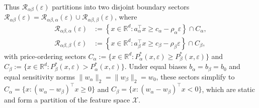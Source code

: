 Thus $\mathcal{R}_{\alpha\beta}(\varepsilon)$ partitions into two disjoint boundary sectors $\mathcal{R}_{\alpha\beta}(\varepsilon) = \mathcal{R}_{\alpha\beta,\alpha}(\varepsilon) \cup \mathcal{R}_{\alpha\beta,\beta}(\varepsilon)$, where
\begin{align}
\mathcal{R}_{\alpha\beta,\alpha}(\varepsilon) &:= \left\{x \in \mathbb{R}^d : a_\alpha^\top x \ge c_\alpha - \rho_\alpha \varepsilon\right\} \cap C_\alpha, \\
\mathcal{R}_{\alpha\beta,\beta}(\varepsilon) &:= \left\{x \in \mathbb{R}^d : a_\beta^\top x \ge c_\beta - \rho_\beta \varepsilon\right\} \cap C_\beta,
\end{align}
with price-ordering sectors $C_\alpha := \{x \in \mathbb{R}^d : P_\alpha^*(x, \varepsilon) \ge P_\beta^*(x, \varepsilon)\}$ and $C_\beta := \{x \in \mathbb{R}^d : P_\beta^*(x, \varepsilon) > P_\alpha^*(x, \varepsilon)\}$. Under equal biases $b_\alpha = b_\beta = b_0$ and equal sensitivity norms $\|w_\alpha\|_2 = \|w_\beta\|_2 = w_0$, these sectors simplify to $C_\alpha = \{x : (w_\alpha - w_\beta)^\top x \ge 0\}$ and $C_\beta = \{x : (w_\alpha - w_\beta)^\top x < 0\}$, which are static and form a partition of the feature space $\mathcal{X}$.

